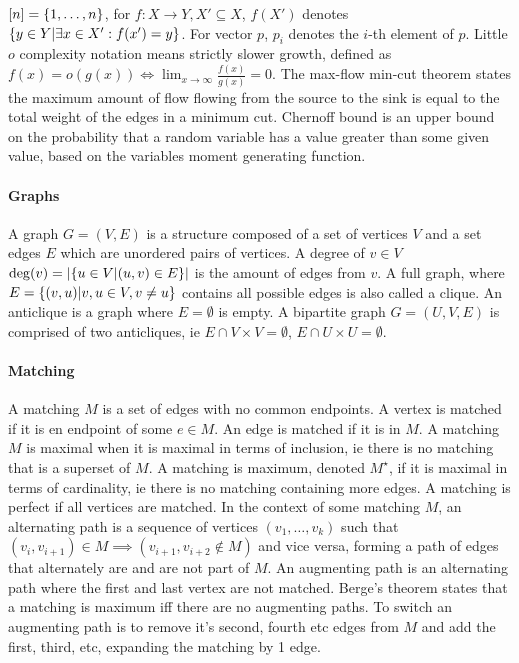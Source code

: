 $[n]=\{1,\dots,n\}$, for $f:X\to Y,X'\subseteq X$, $f(X')$ denotes $\{y\in Y|\exists x\in X':f(x')=y\}$. For vector $p$, $p_i$ denotes the $i$-th element of $p$. Little $o$ complexity notation means strictly slower growth, defined as $f(x)=o(g(x))\iff\lim_{x\to\infty}\frac{f(x)}{g(x)}=0$. The max-flow min-cut theorem states the maximum amount of flow flowing from the source to the sink is equal to the total weight of the edges in a minimum cut. Chernoff bound is an upper bound on the probability that a random variable has a value greater than some given value, based on the variables moment generating function.
\paragraph{Graphs}
A graph $G=(V,E)$ is a structure composed of a set of vertices $V$ and a set edges $E$ which are unordered pairs of vertices. A degree of $v\in V$ $\deg(v)=|\{u\in V|(u,v)\in E\}|$ is the amount of edges from $v$.
A full graph, where $E=\{(v,u)|v,u\in V,v\neq u\}$ contains all possible edges is also called a clique. An anticlique is a graph where $E=\emptyset$ is empty. A bipartite graph $G=(U,V,E)$ is comprised of two anticliques, ie $E\cap V\times V=\emptyset$, $E\cap U\times U=\emptyset$.
\paragraph{Matching}
A matching $M$ is a set of edges with no common endpoints. A vertex is matched if it is en endpoint of some $e\in M$. An edge is matched if it is in $M$. A matching $M$ is maximal when it is maximal in terms of inclusion, ie there is no matching that is a superset of $M$. A matching is maximum, denoted $M^\star$, if it is maximal in terms of cardinality, ie there is no matching containing more edges. A matching is perfect if all vertices are matched. In the context of some matching $M$, an alternating path is a sequence of vertices $(v_1,\dots,v_k)$ such that $(v_i,v_{i+1})\in M\implies(v_{i+1},v_{i+2}\not\in M)$ and vice versa, forming a path of edges that alternately are and are not part of $M$. An augmenting path is an alternating path where the first and last vertex are not matched. Berge's theorem states that a matching is maximum iff there are no augmenting paths. To switch an augmenting path is to remove it's second, fourth etc edges from $M$ and add the first, third, etc, expanding the matching by 1 edge.
